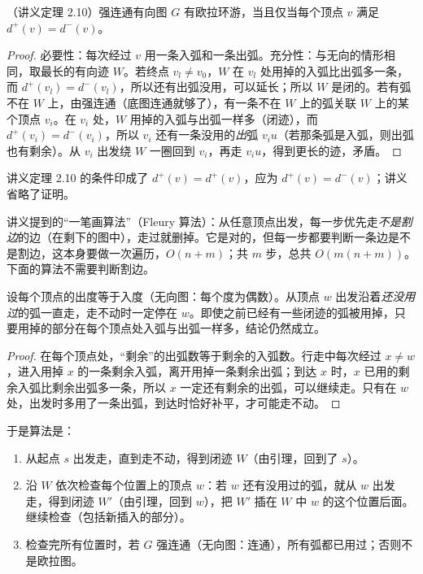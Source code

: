 \begin{theorem}\label{thm:euler-tours:directed}
（讲义定理 2.10）强连通有向图 $G$ 有欧拉环游，当且仅当每个顶点 $v$ 满足 $d^+(v)=d^-(v)$。
\end{theorem}
\begin{proof}
必要性：每次经过 $v$ 用一条入弧和一条出弧。充分性：与无向的情形相同，取最长的有向迹 $W$。若终点 $v_l\neq v_0$，$W$ 在 $v_l$ 处用掉的入弧比出弧多一条，而 $d^+(v_l)=d^-(v_l)$，所以还有出弧没用，可以延长；所以 $W$ 是闭的。若有弧不在 $W$ 上，由强连通（底图连通就够了），有一条不在 $W$ 上的弧关联 $W$ 上的某个顶点 $v_i$。在 $v_i$ 处，$W$ 用掉的入弧与出弧一样多（闭迹），而 $d^+(v_i)=d^-(v_i)$，所以 $v_i$ 还有一条没用的\emph{出}弧 $v_iu$（若那条弧是入弧，则出弧也有剩余）。从 $v_i$ 出发绕 $W$ 一圈回到 $v_i$，再走 $v_iu$，得到更长的迹，矛盾。
\end{proof}

\begin{remark}
讲义定理 2.10 的条件印成了 $d^+(v)=d^+(v)$，应为 $d^+(v)=d^-(v)$；讲义省略了证明。
\end{remark}


讲义提到的“一笔画算法”（Fleury 算法）：从任意顶点出发，每一步优先走\emph{不是割边}的边（在剩下的图中），走过就删掉。它是对的，但每一步都要判断一条边是不是割边，这本身要做一次遍历，$O(n+m)$；共 $m$ 步，总共 $O(m(n+m))$。下面的算法不需要判断割边。


\begin{lemma}\label{lem:euler-tours:stuck}
设每个顶点的出度等于入度（无向图：每个度为偶数）。从顶点 $w$ 出发沿着\emph{还没用过}的弧一直走，走不动时一定停在 $w$。即使之前已经有一些闭迹的弧被用掉，只要用掉的部分在每个顶点处入弧与出弧一样多，结论仍然成立。
\end{lemma}
\begin{proof}
在每个顶点处，“剩余”的出弧数等于剩余的入弧数。行走中每次经过 $x\neq w$，进入用掉 $x$ 的一条剩余入弧，离开用掉一条剩余出弧；到达 $x$ 时，$x$ 已用的剩余入弧比剩余出弧多一条，所以 $x$ 一定还有剩余的出弧，可以继续走。只有在 $w$ 处，出发时多用了一条出弧，到达时恰好补平，才可能走不动。
\end{proof}

于是算法是：
\begin{enumerate}
\item 从起点 $s$ 出发走，直到走不动，得到闭迹 $W$（由引理，回到了 $s$）。
\item 沿 $W$ 依次检查每个位置上的顶点 $w$：若 $w$ 还有没用过的弧，就从 $w$ 出发走，得到闭迹 $W'$（由引理，回到 $w$），把 $W'$ 插在 $W$ 中 $w$ 的这个位置后面。继续检查（包括新插入的部分）。
\item 检查完所有位置时，若 $G$ 强连通（无向图：连通），所有弧都已用过；否则不是欧拉图。
\end{enumerate}

